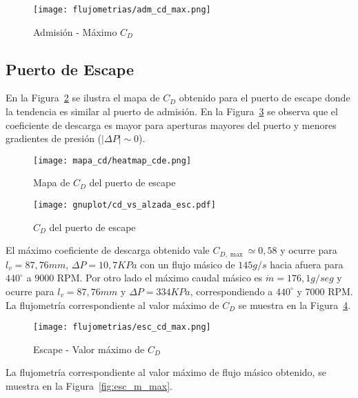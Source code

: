 \begin{figure}[h!]
    \centering
    \texttt{[image: flujometrias/adm\_cd\_max.png]}
    \caption{Admisión - Máximo $C_{D}$}\label{fig:adm_cd_max}
\end{figure}


\subsection{Puerto de Escape}
%
En la Figura~\ref{fig:mapa_cd_escape} se ilustra el mapa de $C_{D}$ obtenido para el
puerto de escape donde la tendencia es similar al puerto de admisión.
%
En la Figura~\ref{fig:cd_escape} se observa que el coeficiente de descarga es
mayor para aperturas mayores del puerto y menores gradientes de presión
($|\Delta P|\sim 0$).



\begin{figure}[h!]
    \centering
    \texttt{[image: mapa\_cd/heatmap\_cde.png]}
    \caption{Mapa de $C_{D}$ del puerto de escape}\label{fig:mapa_cd_escape}
\end{figure}

\begin{figure}[h!]
    \centering
    \texttt{[image: gnuplot/cd\_vs\_alzada\_esc.pdf]}
    \caption{$C_{D}$ del puerto de escape}\label{fig:cd_escape}
\end{figure}

El máximo coeficiente de descarga obtenido vale $C_{D,\max}\simeq 0,58$ y ocurre
para $l_{v}=87,76 mm$, $\Delta P=10,7 KPa$ con un flujo másico de $145 g/s$
hacia afuera para $440^{\circ}$ a $9000$ RPM.
%
Por otro lado el máximo caudal másico es $\dot{m}=176,1 g/seg$ y ocurre para
$l_{v}=87,76 mm$ y $\Delta P=334 KPa$, correspondiendo a $440^{\circ}$ y 7000
RPM.
%
La flujometría correspondiente al valor máximo de $C_{D}$ se muestra en la
Figura~\ref{fig:esc_cd_max}.
%

\begin{figure}[h!]
    \centering
    \texttt{[image: flujometrias/esc\_cd\_max.png]}
    \caption{Escape - Valor máximo de $C_{D}$}\label{fig:esc_cd_max}
\end{figure}

La flujometría correspondiente al valor máximo de flujo másico obtenido, se
muestra en la Figura~\ref{fig:esc_m_max}.

